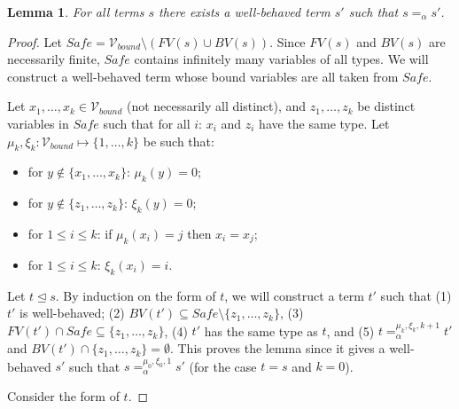 \documentclass{lmcs}
\theoremstyle{theorem}\newtheorem{theorem}[dummy]{Theorem}
\theoremstyle{theorem}\newtheorem{lemma}[dummy]{Lemma}
\theoremstyle{theorem}\newtheorem{corollary}[dummy]{Corollary}
\theoremstyle{definition}\newtheorem{definition}[dummy]{Definition}
\theoremstyle{definition}\newtheorem{example}[dummy]{Example}
\newcommand{\Vbound}{\mathcal{V}_{\mathit{bound}}}
\newcommand{\FV}{\mathit{FV}}
\newcommand{\BV}{\mathit{BV}}
\newcommand{\avar}{x}
\newcommand{\bvar}{y}
\newcommand{\cvar}{z}
\newcommand{\subtermeq}{\unlhd}
\begin{document}
\begin{lemma}\label{lem:wellbehaved}
For all terms $s$ there exists a well-behaved term $s'$ such that $s =_\alpha s'$.
\end{lemma}

\begin{proof}
Let $\mathit{Safe} = \Vbound \setminus (\FV(s) \cup \BV(s))$.  Since $\FV(s)$ and $\BV(s)$ are
necessarily finite, $\mathit{Safe}$ contains infinitely many variables of all types.  We will
construct a well-behaved term whose bound variables are all taken from $\mathit{Safe}$.

Let $\avar_1,\dots,\avar_k \in \Vbound$ (not necessarily all distinct), and $\cvar_1,\dots,\cvar_k$
be distinct variables in $\mathit{Safe}$ such that for all $i$: $\avar_i$ and $\cvar_i$ have the
same type.  Let $\mu_k,\xi_k : \Vbound \mapsto \{1,\dots,k\}$ be such that:
\begin{itemize}
\item for $\bvar \notin \{\avar_1,\dots,\avar_k\}$: $\mu_k(\bvar) = 0$;
\item for $\bvar \notin \{\cvar_1,\dots,\cvar_k\}$: $\xi_k(\bvar) = 0$;
\item for $1 \leq i \leq k$: if $\mu_k(\avar_i) = j$ then $\avar_i = \avar_j$;
\item for $1 \leq i \leq k$: $\xi_k(\avar_i) = i$.
\end{itemize}
Let $t \subtermeq s$.  By induction on the form of $t$, we will construct a term $t'$ such that
(1) $t'$ is well-behaved; (2) $\BV(t') \subseteq \mathit{Safe} \setminus \{\cvar_1,\dots,\cvar_k
\}$, (3) $\FV(t') \cap \mathit{Safe} \subseteq \{\cvar_1,\dots,\cvar_k\}$, (4) $t'$ has the same
type as $t$, and (5) $t =_\alpha^{\mu_k,\xi_k,k+1} t'$ and $\BV(t') \cap \{\cvar_1,\dots,\cvar_k\}
= \emptyset$.  This proves the lemma since it gives a well-behaved $s'$ such that
$s =_\alpha^{\mu_0,\xi_0,1} s'$ (for the case $t = s$ and $k = 0$).

Consider the form of $t$.


\end{proof}
\end{document}
